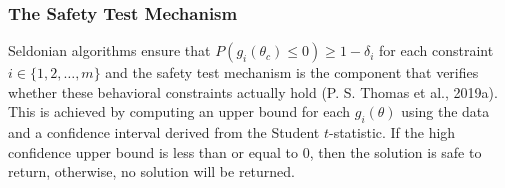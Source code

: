 \documentclass[12pt, twoside]{amherstthesis}
\begin{document}
\hypertarget{safety}{%
\subsubsection{The Safety Test Mechanism}\label{safety}}

Seldonian algorithms ensure that \(P(g_i(\theta_c) \leq 0) \geq 1 - \delta_i\) for each constraint \(i \in \{ 1,2, \ldots, m \}\) and the safety test mechanism is the component that verifies whether these behavioral constraints actually hold (P. S. Thomas et al., 2019a). This is achieved by computing an upper bound for each \(g_i(\theta)\) using the data and a confidence interval derived from the Student \(t\)-statistic. If the high confidence upper bound is less than or equal to 0, then the solution is safe to return, otherwise, no solution will be returned.
\end{document}
